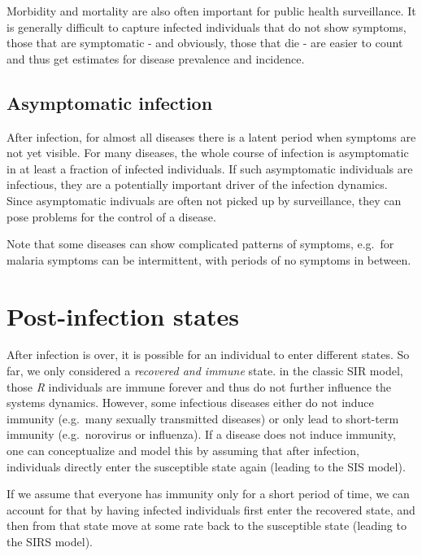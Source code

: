 \documentclass[
]{book}
\begin{document}
Morbidity and mortality are also often important for public health surveillance. It is generally difficult to capture infected individuals that do not show symptoms, those that are symptomatic - and obviously, those that die - are easier to count and thus get estimates for disease prevalence and incidence.

\hypertarget{asymptomatic-infection}{%
\subsection{Asymptomatic infection}\label{asymptomatic-infection}}

After infection, for almost all diseases there is a latent period when symptoms are not yet visible. For many diseases, the whole course of infection is asymptomatic in at least a fraction of infected individuals. If such asymptomatic individuals are infectious, they are a potentially important driver of the infection dynamics. Since asymptomatic indivuals are often not picked up by surveillance, they can pose problems for the control of a disease.

Note that some diseases can show complicated patterns of symptoms, e.g.~for malaria symptoms can be intermittent, with periods of no symptoms in between.

\hypertarget{post-infection-states}{%
\section{Post-infection states}\label{post-infection-states}}

After infection is over, it is possible for an individual to enter different states. So far, we only considered a \emph{recovered and immune} state. in the classic SIR model, those \emph{R} individuals are immune forever and thus do not further influence the systems dynamics. However, some infectious diseases either do not induce immunity (e.g.~many sexually transmitted diseases) or only lead to short-term immunity (e.g.~norovirus or influenza). If a disease does not induce immunity, one can conceptualize and model this by assuming that after infection, individuals directly enter the susceptible state again (leading to the SIS model).

If we assume that everyone has immunity only for a short period of time, we can account for that by having infected individuals first enter the recovered state, and then from that state move at some rate back to the susceptible state (leading to the SIRS model).
\end{document}
